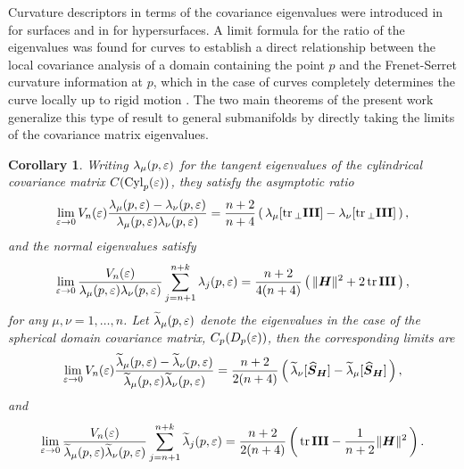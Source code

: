 \documentclass[letterpaper, reqno, 11pt]{amsart}
\newtheorem{corollary}[theorem]{Corollary}
\theoremstyle{definition}
\theoremstyle{remark}
\numberwithin{equation}{section}
\begin{document}
Curvature descriptors in terms of the covariance eigenvalues were introduced in \cite{pottmann2007} for surfaces and in \cite{alvarez2018a} for hypersurfaces. A limit formula for the ratio of the eigenvalues was found for curves \cite{alvarez2017} to establish a direct relationship between the local covariance analysis of a domain containing the point $p$ and the Frenet-Serret curvature information at $p$, which in the case of curves completely determines the curve locally up to rigid motion \cite[Th. 2.13]{kuhnel2006differential}. The two main theorems of the present work generalize this type of result to general submanifolds by directly taking the limits of the covariance matrix eigenvalues.

\begin{corollary}
 Writing $\lambda_\mu(p,\varepsilon)$ for the tangent eigenvalues of the cylindrical covariance matrix $C(\mathrm{Cyl}_p(\varepsilon))$, they satisfy the asymptotic ratio
\begin{equation}
		\lim_{\varepsilon\rightarrow 0}V_n(\varepsilon)\frac{\lambda_\mu(p,\varepsilon)-\lambda_\nu(p,\varepsilon)}{\lambda_\mu(p,\varepsilon)\lambda_\nu(p,\varepsilon)} = \frac{n+2}{n+4}\left(\, \lambda_\mu[\mathrm{tr}\,_\perp\boldsymbol{\mathrm{III}}] - \lambda_\nu[\mathrm{tr}\,_\perp\boldsymbol{\mathrm{III}}] \,\right),
\end{equation}
	and the normal eigenvalues satisfy
\begin{equation}
		 \lim_{\varepsilon\rightarrow 0}\frac{V_n(\varepsilon)}{\lambda_\mu(p,\varepsilon)\lambda_\nu(p,\varepsilon)}\sum_{j=n+1}^{n+k}\lambda_j(p,\varepsilon) = \frac{n+2}{4(n+4)}\left(\, \|\boldsymbol{H}\|^2 +2\,\mathrm{tr}\,\boldsymbol{\mathrm{III}} \, \right),
\end{equation}
	for any $\mu,\nu=1,\dots, n$. Let $\widetilde{\lambda}_\mu(p,\varepsilon)$ denote the eigenvalues in the case of the spherical domain covariance matrix, $C_p(D_p(\varepsilon))$, then the corresponding limits are
\begin{equation}
		\lim_{\varepsilon\rightarrow 0}V_n(\varepsilon)\frac{\widetilde{\lambda}_\mu(p,\varepsilon)-\widetilde{\lambda}_\nu(p,\varepsilon)}{\widetilde{\lambda}_\mu(p,\varepsilon)\widetilde{\lambda}_\nu(p,\varepsilon)} = \frac{n+2}{2(n+4)}\left(\, \widetilde{\lambda}_\nu[\boldsymbol{\widehat{S}}_{\boldsymbol{H}}] - \widetilde{\lambda}_\mu[\boldsymbol{\widehat{S}}_{\boldsymbol{H}}] \,\right),
\end{equation}
	and
\begin{equation}
		 \lim_{\varepsilon\rightarrow 0}\frac{V_n(\varepsilon)}{\widetilde{\lambda}_\mu(p,\varepsilon)\widetilde{\lambda}_\nu(p,\varepsilon)}\sum_{j=n+1}^{n+k}\widetilde{\lambda}_j(p,\varepsilon) = \frac{n+2}{2(n+4)}\left(\, \mathrm{tr}\,\boldsymbol{\mathrm{III}} -\frac{1}{n+2}\|\boldsymbol{H}\|^2 \, \right).
\end{equation}
\end{corollary}
\end{document}
